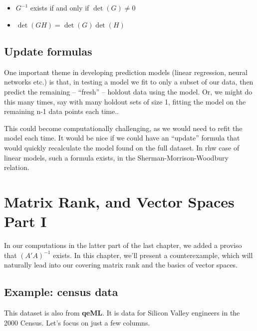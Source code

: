 \documentclass[
  letterpaper,
  DIV=11,
  numbers=noendperiod,
  oneside]{scrreprt}
\begin{document}
\begin{itemize}
\item
  \(G^{-1}\) exists if and only if \(\det(G) \neq 0\)
\item
  \(\det(GH) = \det(G) \det(H)\)
\end{itemize}

\hypertarget{update-formulas}{%
\section{Update formulas}\label{update-formulas}}

One important theme in developing prediction models (linear regression,
neural networks etc.) is that, in testing a model we fit to only a
subset of our data, then predict the remaining -- ``fresh'' -- holdout
data using the model. Or, we might do this many times, say with many
holdout sets of size 1, fitting the model on the remaining n-1 data
points each time..

This could become computationally challenging, as we would need to refit
the model each time. It would be nice if we could have an ``update''
formula that would quickly recalculate the model found on the full
dataset. In rhw case of linear models, such a formula exists, in the
Sherman-Morrison-Woodbury relation.


\hypertarget{matrix-rank-and-vector-spaces-part-i}{%
\chapter{Matrix Rank, and Vector Spaces Part
I}\label{matrix-rank-and-vector-spaces-part-i}}

\newpage{}

In our computations in the latter part of the last chapter, we added a
proviso that \((A'A)^{-1}\) exists. In this chapter, we'll present a
counterexample, which will naturally lead into our covering matrix rank
and the basics of vector spaces.

\hypertarget{example-census-data}{%
\section{Example: census data}\label{example-census-data}}

This dataset is also from \textbf{qeML}. It is data for Silicon Valley
engineers in the 2000 Census. Let's focus on just a few columns.
\end{document}
